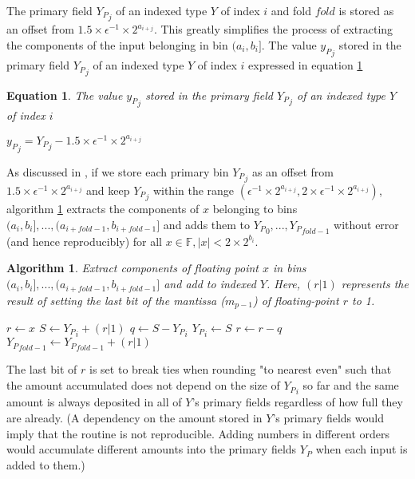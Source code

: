 \documentclass[12pt]{article}
\providecommand{\F}{\ensuremath{\mathbb{F}}}
\theoremstyle{plain}
\newtheorem{alg}{Algorithm}[section]
\newtheorem{eq}{Equation}[section]
\begin{document}
      The primary field ${Y_P}_j$ of an indexed type $Y$ of index $i$ and fold $fold$ is stored as an offset from $1.5\times \epsilon^{-1} \times 2^{a_{i + j}}$. This greatly simplifies the process of extracting the components of the input belonging in bin $(a_i, b_i]$.
      The value ${y_P}_j$ stored in the primary field ${Y_P}_j$ of an indexed type $Y$ of index $i$ expressed in equation \ref{eq:pri}
      \begin{eq} The value ${y_P}_j$ stored in the primary field ${Y_P}_j$ of an indexed type $Y$ of index $i$

        ${y_P}_j = {Y_P}_j - 1.5\times\epsilon^{-1}\times2^{a_{i + j}}$
        \label{eq:pri}
      \end{eq}
      As discussed in \cite{repsum}, if we store each primary bin ${Y_P}_j$ as an offset from $1.5 \times \epsilon^{-1} \times 2^{a_{i + j}}$ and keep ${Y_P}_j$ within the range $(\epsilon^{-1} \times 2^{a_{i + j}}, 2 \times \epsilon^{-1} \times 2^{a_{i + j}})$, algorithm \ref{alg:deposit} extracts the components of $x$ belonging to bins $(a_i, b_i], ..., (a_{i + fold - 1}, b_{i + fold - 1}]$ and adds them to ${Y_P}_0, ..., {Y_P}_{fold - 1}$ without error (and hence reproducibly) for all $x \in \F, |x| < 2 \times 2^{b_i}$.
      \begin{alg}
        Extract components of floating point $x$ in bins $(a_i, b_i], ..., (a_{i + fold - 1}, b_{i + fold - 1}]$ and add to indexed $Y$. Here, $(r | 1)$ represents the result of setting the last bit of the mantissa ($m_{p - 1}$) of floating-point $r$ to 1.
        \begin{algorithmic}
            \State $r \gets x$
              \State $S \gets {Y_P}_i + (r | 1)$
              \State $q \gets S - {Y_P}_i$
              \State ${Y_P}_i \gets S$
              \State $r \gets r - q$
            \EndFor
            \State ${Y_P}_{fold - 1} \gets {Y_P}_{fold - 1} + (r | 1)$
          \EndFunction
        \end{algorithmic}
        \label{alg:deposit}
      \end{alg}
      The last bit of $r$ is set to break ties when rounding "to nearest even" such that the amount accumulated does not depend on the size of ${Y_P}_i$ so far and the same amount is always deposited in all of $Y$'s primary fields regardless of how full they are already. (A dependency on the amount stored in $Y$'s primary fields would imply that the routine is not reproducible. Adding numbers in different orders would accumulate different amounts into the primary fields $Y_P$ when each input is added to them.)
\end{document}
